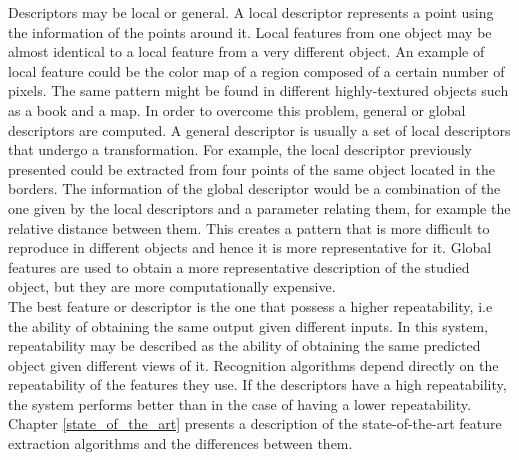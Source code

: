 Descriptors may be local or general. 
A local descriptor represents a point using the information of the points around it. 
Local features from one object may be almost identical to a local feature from a very different object. 
An example of local feature could be the color map of a region composed of a certain number of pixels. 
The same pattern might be found in different highly-textured objects such as a book and a map. 
In order to overcome this problem, general or global descriptors are computed. 
A general descriptor is usually a set of local descriptors that undergo a transformation. 
For example, the local descriptor previously presented could be extracted from four points of the same object located in the borders. 
The information of the global descriptor would be a combination of the one given by the local descriptors and a parameter relating them, for example the relative distance between them. 
This creates a pattern that is more difficult to reproduce in different objects and hence it is more representative for it. 
Global features are used to obtain a more representative description of the studied object, but they are more computationally expensive. 
\\

The best feature or descriptor is the one that possess a higher repeatability, i.e the ability of obtaining the same output given different inputs. 
In this system, repeatability may be described as the ability of obtaining the same predicted object given different views of it. 
Recognition algorithms depend directly on the repeatability of the features they use. 
If the descriptors have a high repeatability, the system performs better than in the case of having a lower repeatability. 
\\

Chapter \ref{state_of_the_art} presents a description of the state-of-the-art feature extraction algorithms and the differences between them. 